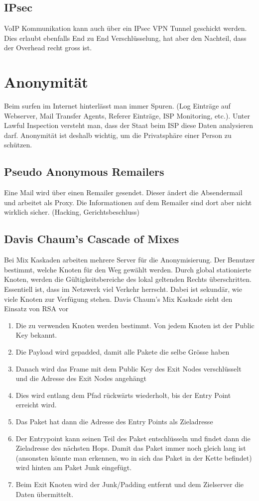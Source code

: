 \subsection{IPsec}
VoIP Kommunikation kann auch über ein IPsec VPN Tunnel geschickt werden. Dies erlaubt ebenfalls End zu End Verschlüsselung, hat aber den Nachteil, dass der Overhead recht gross ist.

\section{Anonymität}
Beim surfen im Internet hinterlässt man immer Spuren. (Log Einträge auf Webserver, Mail Transfer Agents, Referer Einträge, ISP Monitoring, etc.). Unter Lawful Inspection versteht man, dass der Staat beim ISP diese Daten analysieren darf. Anonymität ist deshalb wichtig, um die Privatsphäre einer Person zu schützen.


\subsection{Pseudo Anonymous Remailers}
Eine Mail wird über einen Remailer gesendet. Dieser ändert die Absendermail und arbeitet als Proxy. Die Informationen auf dem Remailer sind dort aber nicht wirklich sicher. (Hacking, Gerichtsbeschluss)
\subsection{Davis Chaum's Cascade of Mixes}
Bei Mix Kaskaden arbeiten mehrere Server für die Anonymisierung. Der Benutzer bestimmt, welche Knoten für den Weg gewählt werden. Durch global stationierte Knoten, werden die Gültigkeitsbereiche des lokal geltenden Rechts überschritten. Essentiell ist, dass im Netzwerk viel Verkehr herrscht. Dabei ist sekundär, wie viele Knoten zur Verfügung stehen. Davis Chaum's Mix Kaskade sieht den Einsatz von RSA vor
\begin{enumerate}
	\item Die zu verwenden Knoten werden bestimmt. Von jedem Knoten ist der Public Key bekannt.
	\item Die Payload wird gepadded, damit alle Pakete die selbe Grösse haben
	\item Danach wird das Frame mit dem Public Key des Exit Nodes verschlüsselt und die Adresse des Exit Nodes angehängt
	\item Dies wird entlang dem Pfad rückwärts wiederholt, bis der Entry Point erreicht wird. 
	\item Das Paket hat dann die Adresse des Entry Points als Zieladresse
	\item Der Entrypoint kann seinen Teil des Paket entschlüsseln und findet dann die Zieladresse des nächsten Hops. Damit das Paket immer noch gleich lang ist (ansonsten könnte man erkennen, wo in sich das Paket in der Kette befindet) wird hinten am Paket Junk eingefügt.
	\item Beim Exit Knoten wird der Junk/Padding entfernt und dem Zielserver die Daten übermittelt.
\end{enumerate}

